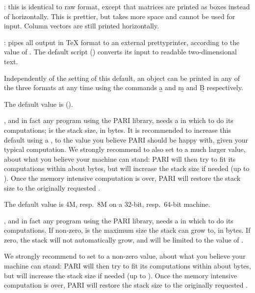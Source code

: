 {\item {}: this is identical to raw format, except
that matrices are printed as boxes instead of horizontally. This is
prettier, but takes more space and cannot be used for input. Column vectors
are still printed horizontally.

\item {}: pipes all 
output in TeX format to an external prettyprinter, according to the value of
. The default script () converts its input
to readable two-dimensional text.

Independently of the setting of this default, an object can be printed
in any of the three formats at any time using the commands \b{a} and \b{m}
and \b{B} respectively.

The default value is  ().

\label{se:def,parisize}
, and in fact any program using the PARI
library, needs a  in which to do its computations; 
is the stack size, in bytes. It is recommended to increase this
default using a , to the value you believe PARI should be happy
with, given your typical computation. We strongly recommend to also
set  to a much larger value, about what you believe your
machine can stand: PARI will then try to fit its computations within about
 bytes, but will increase the stack size if needed (up to
). Once the memory intensive computation is over, PARI
will restore the stack size to the originally requested .

The default value is 4M, resp.~8M on a 32-bit, resp.~64-bit machine.

\label{se:def,parisizemax}
, and in fact any program using the PARI library, needs a
 in which to do its computations.  If non-zero,  
is the maximum size the stack can grow to, in bytes.  If zero, the stack will
not automatically grow, and will be limited to the value of .

We strongly recommend to set  to a non-zero value, about
what you believe your machine can stand: PARI will then try to fit its
computations within about  bytes, but will increase the stack
size if needed (up to ). Once the memory intensive
computation is over, PARI will restore the stack size to the originally
requested .

}
